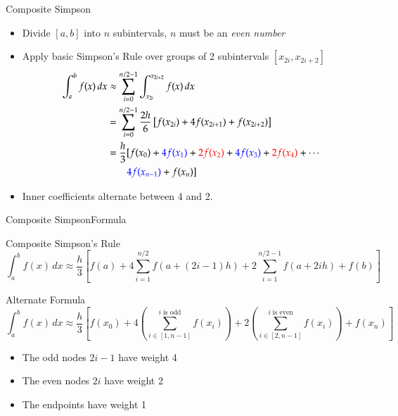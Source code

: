 \documentclass[10pt]{beamer}
\begin{document}
\begin{frame}{Composite Simpson}
\begin{itemize}
    \item Divide $[a,b]$ into $n$ subintervals, $n$ must be an \emph{even number}

\item Apply basic Simpson's Rule over groups of 2 subintervals $[x_{2i},x_{2i+2}]$ 
  \begin{align*}
  \int_{a}^{b} f(x)\,dx & \approx \sum_{i=0}^{n/2-1} \int_{x_{2i}}^{x_{2i+2}} f(x)\,dx\\
                        & = \sum_{i=0}^{n/2-1} \frac{2h}{6}\left[f(x_{2i}) + 4f(x_{2i+1}) + f(x_{2i+2})\right]\\
                        & = \frac{h}{3}[f(x_{0}) + \textcolor{blue}{4f(x_1)} + \textcolor{red}{2f(x_2)} + \textcolor{blue}{4f(x_3)} + \textcolor{red}{2f(x_4)}+ \cdots \\
                        & \quad \quad \textcolor{blue}{4f(x_{n-1})} +f(x_{n})]
  \end{align*}
  \item Inner coefficients alternate between 4 and 2.
\end{itemize}
\end{frame}
\begin{frame}{Composite Simpson}{Formula}
\begin{block}{Composite Simpson's Rule}
  \begin{equation*}
  \int_{a}^{b} f(x)\,dx \approx \frac{h}{3}\left[f(a) + 4 \sum_{i=1}^{n/2} f(a+(2i-1)h) + 2\sum_{i=1}^{n/2 - 1}f(a+2ih) + f(b) \right]
  \end{equation*}
\end{block}

\begin{block}{Alternate Formula}
    \begin{equation*}
    \int_{a}^{b} f(x)\,dx \approx \frac{h}{3}\left[f(x_0) + 4 \left(\sum_{i \in [1,n-1]}^{i\;\text{is odd}} f(x_i)\right) + 2\left(\sum_{i \in [2,n-1]}^{i\;\text{is even}}f(x_i)\right) + f(x_n) \right]
    \end{equation*}
\begin{itemize}
\item The odd nodes $2i-1$ have weight 4 
\item The even nodes $2i$ have weight 2
\item The endpoints have weight 1
\end{itemize}
\end{block}

\end{frame}
\end{document}
